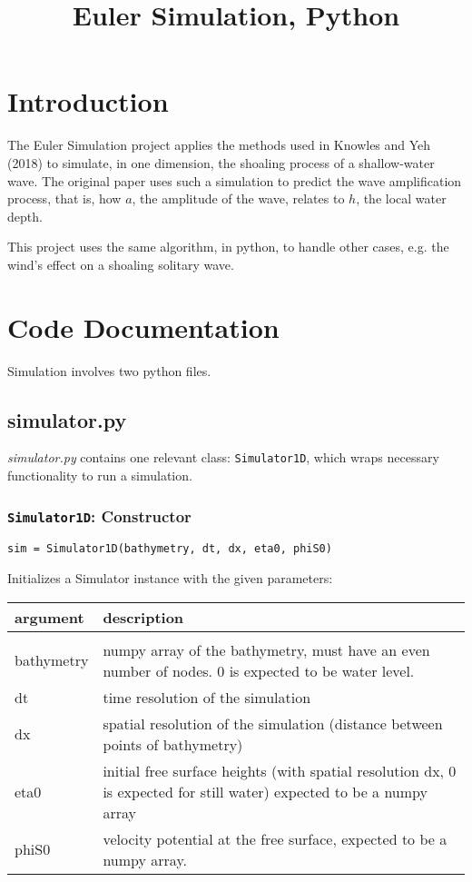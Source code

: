 \documentclass[10pt,a4paper]{article}
\title{Euler Simulation, Python}
\date{}
\newenvironment{arglist}
    {\begin{center}
    \begin{tabular}{l|p{12cm}}
    argument & description\\
    \hline\\
    }
    { 
    \end{tabular} 
    \end{center}
    }
\begin{document}
\maketitle

\tableofcontents
\newpage


\section{Introduction}

The Euler Simulation project applies the methods used in Knowles and Yeh (2018) to simulate, in one dimension, the shoaling process of a shallow-water wave. The original paper uses such a simulation to predict the wave amplification process, that is, how $a$, the amplitude of the wave, relates to $h$, the local water depth.

This project uses the same algorithm, in python, to handle other cases, e.g. the wind's effect on a shoaling solitary wave.
\pagebreak


\section{Code Documentation}

Simulation involves two python files.

\subsection{simulator.py}
\textit{simulator.py} contains one relevant class: \texttt{Simulator1D}, which wraps necessary functionality to run a simulation.





\subsubsection{\texttt{Simulator1D}: Constructor}
\texttt{sim = Simulator1D(bathymetry, dt, dx, eta0, phiS0)}

Initializes a Simulator instance with the given parameters:
\begin{arglist}
            bathymetry  &  numpy array of the bathymetry, must have an even
                            number of nodes. 0 is expected to be water level.\\\hline
            dt          &  time resolution of the simulation\\\hline
            dx          &  spatial resolution of the simulation (distance
                            between points of bathymetry)\\\hline
            eta0        &  initial free surface heights (with spatial
                            resolution dx, 0 is expected for still water)
                            expected to be a numpy array\\\hline
            phiS0       &  velocity potential at the free surface, expected
                            to be a numpy array.
\end{arglist}
\end{document}
